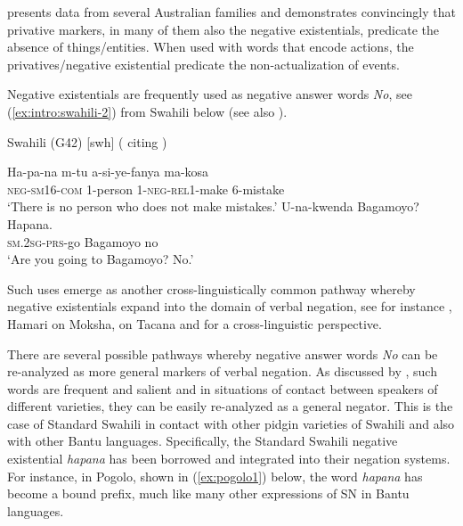 \documentclass[output=paper,chinesefont,colorlinks,citecolor=brown]{langscibook}
\begin{document}
 presents data from several Australian families and demonstrates convincingly that privative markers, in many of them also the negative existentials, predicate the absence of things/entities. When used with words that encode actions, the privatives/negative existential predicate the non-actualization of events.

Negative existentials are frequently used as negative answer words \textit{No}, see (\ref{ex:intro:swahili-2}) from Swahili below (see also ).
\begin{exe}
\ex Swahili (G42) [swh] ( citing \citet[25]{KingeiNdalu2009}) \label{ex:intro:swahili-2}
\begin{xlist}
\ex \label{ex:intro:swahili-2a}
\gll Ha-pa-na m-tu a-si-ye-fanya ma-kosa\\
\textsc{neg}-\textsc{sm}16-\textsc{com} 1-person
1-\textsc{neg}-\textsc{rel}1-make 6-mistake\\
\glt `There is no person who does not make mistakes.'
\ex \label{ex:intro:swahili-2b}
\gll U-na-kwenda Bagamoyo? Hapana.\\
	\textsc{sm.2sg}-\textsc{prs}-go Bagamoyo no\\
\glt 	`Are you going to Bagamoyo? No.'
\end{xlist}
\end{exe}


Such uses  emerge as another cross-linguistically common pathway whereby negative existentials expand into the domain of verbal negation, see for instance , Hamari on Moksha,  on Tacana and  for a cross-linguistic perspective.

There are several possible pathways whereby negative answer words \textit{No} can be re-analyzed as more general markers of verbal negation. As discussed by , such words are frequent and salient and in situations of contact between speakers of different varieties, they can be easily re-analyzed as a general negator. This is the case of Standard Swahili in contact with other pidgin varieties of Swahili and also with other Bantu languages. Specifically, the Standard Swahili negative existential \textit{hapana} has been borrowed and integrated into their negation systems. For instance, in Pogolo, shown in (\ref{ex:pogolo1}) below, the word \textit{hapana} has become a bound prefix, much like many other expressions of SN in Bantu languages.
\end{document}
